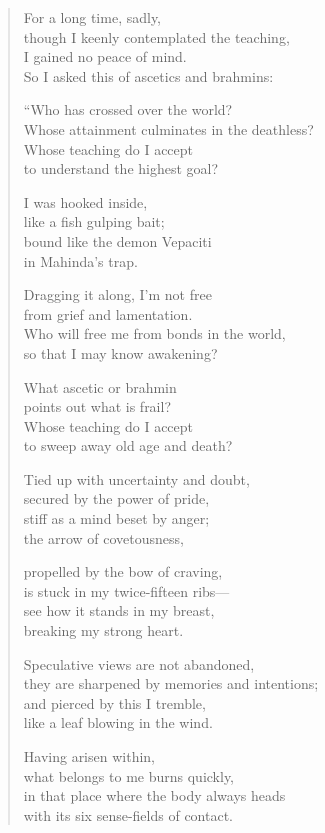 \documentclass[12pt,openany]{book}%
\begin{document}
\begin{verse}%
For a long time, sadly, \\
though I keenly contemplated the teaching, \\
I gained no peace of mind. \\
So I asked this of ascetics and brahmins: 

“Who has crossed over the world? \\
Whose attainment culminates in the deathless? \\
Whose teaching do I accept \\
to understand the highest goal? 

I was hooked inside, \\
like a fish gulping bait; \\
bound like the demon Vepaciti \\
in Mahinda’s trap. 

Dragging it along, I’m not free \\
from grief and lamentation. \\
Who will free me from bonds in the world, \\
so that I may know awakening? 

What ascetic or brahmin \\
points out what is frail? \\
Whose teaching do I accept \\
to sweep away old age and death? 

Tied up with uncertainty and doubt, \\
secured by the power of pride, \\
stiff as a mind beset by anger; \\
the arrow of covetousness, 

propelled by the bow of craving, \\
is stuck in my twice-fifteen ribs—\\
see how it stands in my breast, \\
breaking my strong heart. 

Speculative views are not abandoned, \\
they are sharpened by memories and intentions; \\
and pierced by this I tremble, \\
like a leaf blowing in the wind. 

Having arisen within, \\
what belongs to me burns quickly, \\
in that place where the body always heads \\
with its six sense-fields of contact. 


\end{verse}
\end{document}
